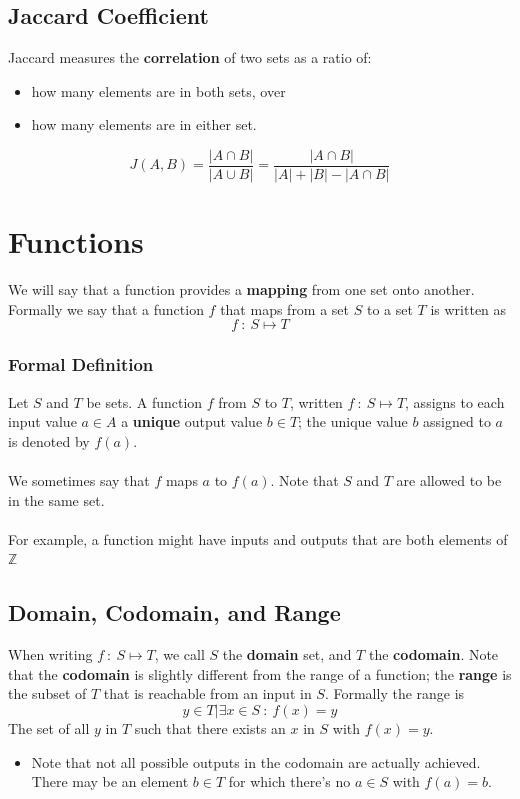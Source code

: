 \documentclass[10pt]{article}
\begin{document}
\subsection*{Jaccard Coefficient}
Jaccard measures the \textbf{correlation} of two sets as a ratio of:
\begin{itemize}
	\item how many elements are in both sets, over
	\item how many elements are in either set.
\end{itemize}
\[J(A, B) = \frac{|A \cap B|}{|A \cup B|} = \frac{|A \cap B|}{|A| + |B| - |A \cap B|}\]

\section*{Functions}
We will say that a function provides a \textbf{mapping} from one set onto another.  Formally we say that a function $f$ that maps from a set $S$ to a set $T$ is written as
\[f \::\: S \mapsto T\]
\subsubsection*{Formal Definition}
Let $S$ and $T$ be sets.  A function $f$ from $S$ to $T$, written $f \::\: S \mapsto T$, assigns to each input value $a \in A$ a \textbf{unique} output value $b \in T$; the unique value $b$ assigned to $a$ is denoted by $f(a)$.\\\\
We sometimes say that $f$ maps $a$ to $f(a)$.  Note that $S$ and $T$ are allowed to be in the same set.\\\\
For example, a function might have inputs and outputs that are both elements of $\mathbb{Z}$

\subsection*{Domain, Codomain, and Range}
When writing $f \::\: S \mapsto T$, we call $S$ the \textbf{domain} set, and $T$ the \textbf{codomain}.  Note that the \textbf{codomain} is slightly different from the range of a function; the \textbf{range} is the subset of $T$ that is reachable from an input in $S$.  Formally the range is
\[y \in T | \exists x \in S \::\: f(x) = y\]
The set of all $y$ in $T$ such that there exists an $x$ in $S$ with $f(x) = y$.
\begin{itemize}
	\item Note that not all possible outputs in the codomain are actually achieved.  There may be an element $b \in T$ for which there's no $a \in S$ with $f(a) = b$.
\end{itemize}
\end{document}
